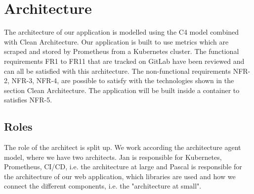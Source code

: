 \chapter{Architecture}

    

The architecture of our application is modelled using the C4 model combined with Clean Architecture.
Our application is built to use metrics which are scraped and stored by Prometheus from a Kubernetes cluster.
The functional requirements FR1 to FR11 that are tracked on GitLab have been reviewed and can all be satisfied with this architecture. 
The non-functional requirements NFR-2, NFR-3, NFR-4, are possible to satisfy with the technologies shown in the section Clean Architecture.
The application will be built inside a container to satisfies NFR-5.

\section{Roles}
The role of the architect is split up. We work according the architecture agent model, where we have two architects.
Jan is responsible for Kubernetes, Prometheus, CI/CD, i.e. the architecture at large
and Pascal is responsible for the architecture of our web application, which libraries are used and how we connect the different components, i.e. the "architecture at small".

